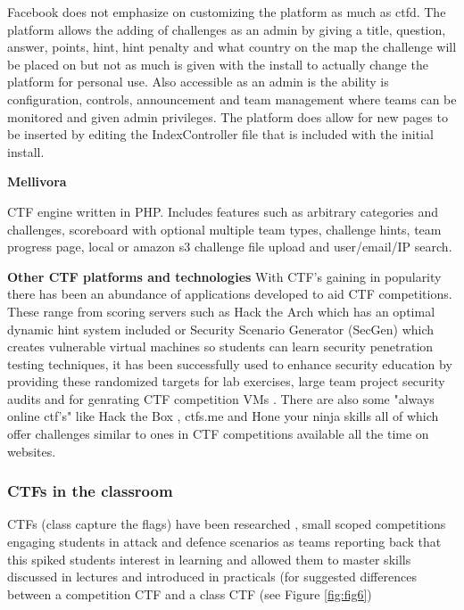 \documentclass[12pt,a4paper]{article}
\begin{document}
Facebook does not emphasize on customizing the platform as much as ctfd. The platform allows the adding of challenges as an admin by giving a title, question, answer, points, hint, hint penalty and what country on the map the challenge will be placed on but not as much is given with the install to actually change the platform for personal use. Also accessible as an admin is the ability is configuration, controls, announcement and team management where teams can be monitored and given admin privileges. The platform does allow for new pages to be inserted by editing the IndexController file that is included with the initial install. 

\textbf{Mellivora} 

CTF engine written in PHP. Includes features such as arbitrary categories and challenges, scoreboard with optional multiple team types, challenge hints, team progress page, local or amazon s3 challenge file upload and user/email/IP search\cite{mellivora}.  

\textbf{Other CTF platforms and technologies}  
With CTF's gaining in popularity there has been an abundance of applications developed to aid CTF competitions. These range from scoring servers such as Hack the Arch \cite{HackTheArch} which has an optimal dynamic hint system included or Security Scenario Generator (SecGen)\cite{SecGen} which creates vulnerable virtual machines so students can learn security penetration testing techniques, it has been successfully used to enhance security education by providing these randomized targets for lab exercises, large team project security audits and for genrating CTF competition VMs \cite{schreuders2017security}. There are also some "always online ctf's" like Hack the Box \cite{HackTheBox}, ctfs.me \cite{ctfs} and Hone your ninja skills \cite{Ninja} all of which offer challenges similar to ones in CTF competitions available all the time on websites. 


\subsubsection{CTFs in the classroom}
CTFs (class capture the flags) have been researched \cite{mirkovic2014class}, small scoped competitions engaging students in attack and defence scenarios as teams reporting back that this spiked students interest in learning and allowed them to master skills discussed in lectures and introduced in practicals (for suggested differences between a competition CTF and a class CTF (see Figure \ref{fig:fig6})   
\end{document}

